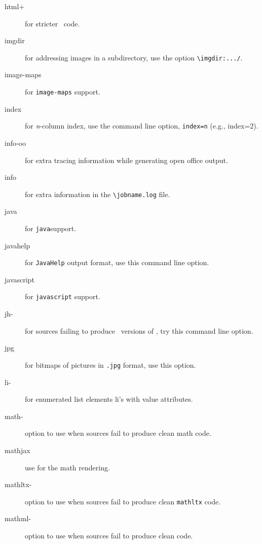 \begin{description}
\item[html+] for stricter \HTML\ code.


\item[imgdir] for addressing images in a subdirectory, use the option
  \verb=\imgdir:.../=.

\item[image-maps] for \verb=image-maps= support.

\item[index] for \emph{n}-column index, use the command line option,
  \verb+index=n+ (e.g., index=2).

\item[info-oo] for extra tracing information while generating open
  office output.

\item[info] for extra information in the \verb=\jobname.log= file.

\item[java] for \verb=java=support.

\item[javahelp] for \verb=JavaHelp= output format, use this command
  line option.

\item[javascript] for \verb=javascript= support.

\item[jh-] for sources failing to produce \xml\ versions of \HTML, try
  this command line option.


\item[jpg] for bitmaps of pictures in \verb=.jpg= format, use this
  option.

\item[li-] for enumerated list elements li's with value attributes.

\item[math-] option to use when sources fail to produce clean math
  code.

\item[mathjax] use  for the math rendering.

\item[mathltx-] option to use when sources fail to produce clean
  \verb=mathltx= code.

\item[mathml-] option to use when sources fail to produce clean
  \mathml code.


\end{description}
